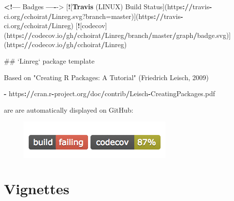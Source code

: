 \documentclass[]{book}
\newenvironment{Shaded}{\begin{snugshade}}{\end{snugshade}}
\newcommand{\KeywordTok}[1]{\textcolor[rgb]{0.13,0.29,0.53}{\textbf{#1}}}
\newcommand{\DataTypeTok}[1]{\textcolor[rgb]{0.13,0.29,0.53}{#1}}
\newcommand{\DecValTok}[1]{\textcolor[rgb]{0.00,0.00,0.81}{#1}}
\newcommand{\StringTok}[1]{\textcolor[rgb]{0.31,0.60,0.02}{#1}}
\newcommand{\OperatorTok}[1]{\textcolor[rgb]{0.81,0.36,0.00}{\textbf{#1}}}
\newcommand{\ErrorTok}[1]{\textcolor[rgb]{0.64,0.00,0.00}{\textbf{#1}}}
\newcommand{\NormalTok}[1]{#1}
\theoremstyle{definition}
\theoremstyle{definition}
\theoremstyle{definition}
\theoremstyle{remark}
\begin{document}
\begin{Shaded}
\begin{Highlighting}[]
\OperatorTok{<!---}\StringTok{ }\NormalTok{Badges }\OperatorTok{----}\NormalTok{->}
\NormalTok{[}\OperatorTok{!}\NormalTok{[}\KeywordTok{Travis}\NormalTok{ (LINUX) Build Status](https}\OperatorTok{:}\ErrorTok{//}\NormalTok{travis}\OperatorTok{-}\NormalTok{ci.org}\OperatorTok{/}\NormalTok{cchoirat}\OperatorTok{/}\NormalTok{Linreg.svg?}\DataTypeTok{branch=}\NormalTok{master)](https}\OperatorTok{:}\ErrorTok{//}\NormalTok{travis}\OperatorTok{-}\NormalTok{ci.org}\OperatorTok{/}\NormalTok{cchoirat}\OperatorTok{/}\NormalTok{Linreg)}
\NormalTok{[}\OperatorTok{!}\NormalTok{[codecov](https}\OperatorTok{:}\ErrorTok{//}\NormalTok{codecov.io}\OperatorTok{/}\NormalTok{gh}\OperatorTok{/}\NormalTok{cchoirat}\OperatorTok{/}\NormalTok{Linreg}\OperatorTok{/}\NormalTok{branch}\OperatorTok{/}\NormalTok{master}\OperatorTok{/}\NormalTok{graph}\OperatorTok{/}\NormalTok{badge.svg)](https}\OperatorTok{:}\ErrorTok{//}\NormalTok{codecov.io}\OperatorTok{/}\NormalTok{gh}\OperatorTok{/}\NormalTok{cchoirat}\OperatorTok{/}\NormalTok{Linreg)}

\NormalTok{## `Linreg` package template}

\NormalTok{Based on }\StringTok{"Creating R Packages: A Tutorial"}\NormalTok{ (Friedrich Leisch, }\DecValTok{2009}\NormalTok{)}

\OperatorTok{-}\StringTok{ }\NormalTok{https}\OperatorTok{:}\ErrorTok{//}\NormalTok{cran.r}\OperatorTok{-}\NormalTok{project.org}\OperatorTok{/}\NormalTok{doc}\OperatorTok{/}\NormalTok{contrib}\OperatorTok{/}\NormalTok{Leisch}\OperatorTok{-}\NormalTok{CreatingPackages.pdf}
\end{Highlighting}
\end{Shaded}

are are automatically displayed on GitHub:

\begin{figure}

{\centering \includegraphics{images/ch3_badges} 

}

\end{figure}

\section{Vignettes}\label{vignettes}
\end{document}
